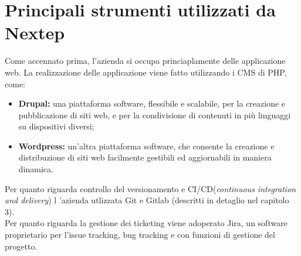 \section{Principali strumenti utilizzati da Nextep}
Come accennato prima, l'azienda si occupa princiaplamente delle applicazione web. La realizzazione delle applicazione viene fatto utilizzando i CMS di PHP, come:
\begin{itemize}

	\item \textbf{Drupal:} una piattaforma software, flessibile e scalabile, per la creazione e pubblicazione
	di siti web, e per la condivisione di contenuti in più linguaggi su
	dispositivi diversi;
		\item \textbf{Wordpress:} un'altra piattaforma software, che consente la creazione e
	distribuzione di siti web facilmente gestibili ed aggiornabili in maniera dinamica.
\end{itemize}

Per quanto riguarda controllo del versionamento e CI/CD(\emph{continuous integration and delivery}) l 'azienda utlizzata Git e Gitlab (descritti in detaglio nel capitolo 3).
\\

Per quanto riguarda la gestione dei ticketing viene adoperato Jira, un software proprietario per l’issue tracking, bug tracking
e con funzioni di gestione del progetto.

